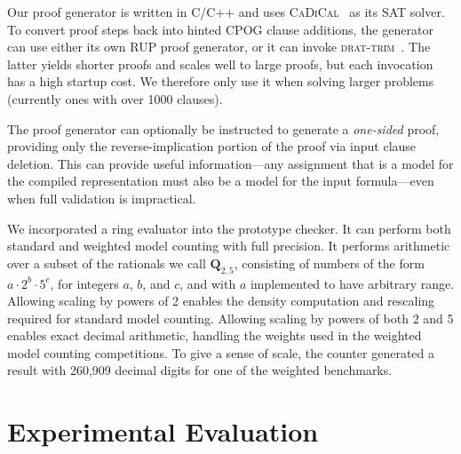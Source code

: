\documentclass[letterpaper,USenglish,cleveref, autoref, thm-restate]{lipics-v2021}
\newcommand{\drational}{\textbf{Q}_{2,5}}
\newcommand{\progname}[1]{\textsc{#1}}
\newcommand{\cadical}{\progname{CaDiCal}}
\newcommand{\dtrim}{\progname{drat-trim}}
\begin{document}
Our proof generator is written in C/C++ and uses
\cadical{}~\cite{biere-cadical-2019} as its SAT solver.  To convert
proof steps back into hinted CPOG clause additions, the generator can
use either its own RUP proof generator, or it can invoke
\dtrim{}~\cite{heule:cade:2013}.  The latter yields shorter proofs and scales well
to large proofs, but each invocation has a high startup cost.  We
therefore only use it when solving larger problems (currently ones
with over 1000 clauses).

The proof generator can optionally be instructed to generate a {\em
one-sided} proof, providing only the reverse-implication portion of the proof via
input clause deletion.  This can provide useful information---any
assignment that is a model for the compiled representation
must also be a model for the input formula---even when
full validation is impractical.

We incorporated a ring evaluator into the prototype checker.  It
can perform both standard and weighted
model counting with full precision.  It performs arithmetic over a subset of the rationals
we call $\drational$, consisting of numbers of the form $a \cdot 2^{b}
\cdot 5^{c}$, for integers $a$, $b$, and $c$, and with $a$ implemented
to have arbitrary range.  Allowing scaling by powers of 2 enables the
density computation and rescaling required for standard model
counting.  Allowing scaling by powers of both 2 and 5 enables exact
decimal arithmetic, handling the weights used in the weighted model
counting competitions.  To give a sense of scale, the counter
generated a result with 260,909 decimal digits
for one of the weighted benchmarks.


\section{Experimental Evaluation}
\label{sect:experimental}

\end{document}

